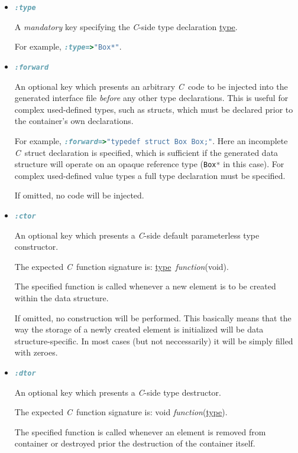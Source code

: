 \documentclass[a4paper]{article}
\newcommand{\C}{\emph{C}}
\newcommand{\st}{\underline{type}}
\newcommand{\meth}[1]{#1}
\begin{document}
\begin{itemize}


\item \lstinline[language=Ruby]!:type!


A \emph{mandatory} key specifying the \C-side type declaration \st.

For example, \lstinline[language=Ruby]!:type=>"Box*"!.


\item \lstinline[language=Ruby]!:forward!


An optional key which presents an arbitrary \C\ code to be injected into the generated interface file \emph{before} any other type declarations.
This is useful for complex used-defined types, such as structs, which must be declared prior to the container's own declarations.


For example, \lstinline[language=Ruby]!:forward=>"typedef struct Box Box;"!.
Here an incomplete \C\ struct declaration is specified, which is sufficient if the generated data structure will operate on an opaque reference type (\lstinline[language=C]{Box*} in this case).
For complex used-defined value types a full type declaration must be specified.


If omitted, no code will be injected.


\item \lstinline[language=Ruby]!:ctor!


An optional key which presents a \C-side default parameterless type constructor.


The expected \C\ function signature is: \meth{\st\ \emph{function}(void)}.


The specified function is called whenever a new element is to be created within the data structure.


If omitted, no construction will be performed. This basically means that the way the storage of a newly created element is initialized will be data structure-specific. In most cases (but not neccessarily) it will be simply filled with zeroes.


\item \lstinline[language=Ruby]!:dtor!


An optional key which presents a \C-side type destructor.


The expected \C\ function signature is: \meth{void \emph{function}(\st)}.


The specified function is called whenever an element is removed from container or destroyed prior the destruction of the container itself.



\end{itemize}
\end{document}
